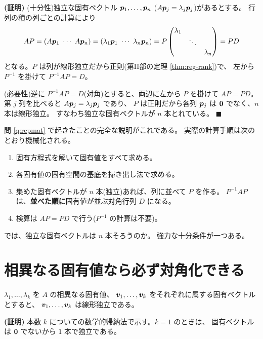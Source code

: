\noindent\textbf{(証明)}\quad
(十分性)独立な固有ベクトル $\bm{p}_1, \dots, \bm{p}_n$
($A\bm{p}_j = \lambda_j\bm{p}_j$)があるとする。
行列の積の列ごとの計算により
\[
AP = (A\bm{p}_1 \ \cdots \ A\bm{p}_n)
= (\lambda_1 \bm{p}_1 \ \cdots \ \lambda_n \bm{p}_n) = P
\begin{pmatrix}\lambda_1 & & \\ & \ddots & \\ & & \lambda_n\end{pmatrix} = PD
\]
となる。$P$ は列が線形独立だから正則(第II部の定理 \ref{thm:reg-rank})で、
左から $P^{-1}$ を掛けて $P^{-1}AP = D$。

(必要性)逆に $P^{-1}AP = D$(対角)とすると、両辺に左から $P$ を掛けて
$AP = PD$。第 $j$ 列を比べると $A\bm{p}_j = \lambda_j \bm{p}_j$ であり、
$P$ は正則だから各列 $\bm{p}_j$ は $\bm{0}$ でなく、$n$ 本は線形独立。
すなわち独立な固有ベクトルが $n$ 本とれている。 $\blacksquare$

問 \ref{q:repmat} で起きたことの完全な説明がこれである。
実際の計算手順は次のとおり機械化される。
\begin{enumerate}
\item 固有方程式を解いて固有値をすべて求める。
\item 各固有値の固有空間の基底を掃き出し法で求める。
\item 集めた固有ベクトルが $n$ 本(独立)あれば、列に並べて $P$ を作る。
$P^{-1}AP$ は、\textbf{並べた順に}固有値が並ぶ対角行列 $D$ になる。
\item 検算は $AP = PD$ で行う($P^{-1}$ の計算は不要)。
\end{enumerate}

では、独立な固有ベクトルは $n$ 本そろうのか。
強力な十分条件が一つある。

\section{相異なる固有値なら必ず対角化できる}

\begin{teiri}[相異なる固有値の固有ベクトルは独立]\label{thm:diag-distinct}
$\lambda_1, \dots, \lambda_k$ を $A$ の相異なる固有値、
$\bm{v}_1, \dots, \bm{v}_k$ をそれぞれに属する固有ベクトルとすると、
$\bm{v}_1, \dots, \bm{v}_k$ は線形独立である。
\end{teiri}

\noindent\textbf{(証明)}\quad
本数 $k$ についての数学的帰納法で示す。$k = 1$ のときは、
固有ベクトルは $\bm{0}$ でないから $1$ 本で独立である。

